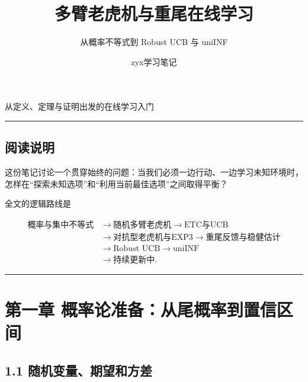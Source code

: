 \documentclass[
  11pt,
  a4paper,
]{ctexart}
\title{多臂老虎机与重尾在线学习}
\subtitle{从概率不等式到 Robust UCB 与 uniINF}
\author{}
\date{zyx学习笔记}
\begin{document}
\maketitle

\thispagestyle{empty}
\vfill
\begin{center}
{\color{BookMuted}\large 从定义、定理与证明出发的在线学习入门}
\end{center}
\vfill
\clearpage
\setcounter{tocdepth}{2}
\tableofcontents
\clearpage



\begin{center}\rule{0.5\linewidth}{0.5pt}\end{center}

\subsection{阅读说明}\label{ux9605ux8bfbux8bf4ux660e}

这份笔记讨论一个贯穿始终的问题：当我们必须一边行动、一边学习未知环境时，怎样在``探索未知选项''和``利用当前最佳选项''之间取得平衡？

全文的逻辑路线是

\[
\begin{aligned}
\text{概率与集中不等式}
&\longrightarrow \text{随机多臂老虎机}
\longrightarrow \text{ETC与UCB}\\
&\longrightarrow \text{对抗型老虎机与EXP3}
\longrightarrow \text{重尾反馈与稳健估计}\\
&\longrightarrow \text{Robust UCB}
\longrightarrow \text{uniINF}\\
&\longrightarrow \text{持续更新中}.
\end{aligned}
\]


\begin{center}\rule{0.5\linewidth}{0.5pt}\end{center}

\section{第一章
概率论准备：从尾概率到置信区间}\label{ux7b2cux4e00ux7ae0-ux6982ux7387ux8bbaux51c6ux5907ux4eceux5c3eux6982ux7387ux5230ux7f6eux4fe1ux533aux95f4}

\subsection{1.1
随机变量、期望和方差}\label{ux968fux673aux53d8ux91cfux671fux671bux548cux65b9ux5dee}
\end{document}
